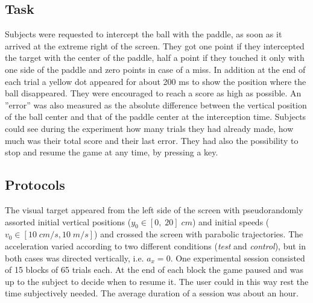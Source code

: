 
\subsection{Task}

Subjects were requested to intercept the ball with the paddle, as soon as it arrived at the extreme right of the screen.  They got one point if they intercepted the target with the center of the paddle, half a point if they touched it only with one side of the paddle and zero points in case of a miss. In addition at the end of each trial a yellow dot appeared for about 200 ms to show the position where the ball disappeared. They were encouraged to reach a score as high as possible. An ''error'' was also measured as the absolute difference between the vertical position of the ball center and that of the paddle center at the interception time. Subjects could see during the experiment how many trials they had already made, how much was their total score and their last error. They had also the possibility to stop and resume the game at any time, by pressing a key.


\subsection{Protocols}

The visual target appeared from the left side of the screen with pseudorandomly assorted initial vertical positions
($y_0 \in \left[0,\;20\right]\;cm $) and initial speeds ($v_0 \in \left[10\; cm/s, 10\; m/s \right]$) and crossed the screen with parabolic trajectories. The acceleration varied according to two different conditions (\textit{test} and \textit{control}), but in both cases was directed vertically, i.e. $a_x=0$. One experimental session consisted of 15 blocks of 65 trials each. At the end of each block the game paused and was up to the subject to decide when to resume it. The user could in this way rest the time subjectively needed. The average duration of a session was about an hour.

